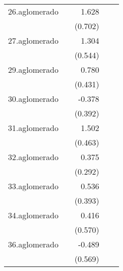 {\begin{longtable}{l*{4}{D{.}{.}{-1}}}
\addlinespace
26.aglomerado&                     &       1.628\sym{*}  &                     &                     \\
            &                     &     (0.702)         &                     &                     \\
\addlinespace
27.aglomerado&                     &       1.304\sym{*}  &                     &                     \\
            &                     &     (0.544)         &                     &                     \\
\addlinespace
29.aglomerado&                     &       0.780         &                     &                     \\
            &                     &     (0.431)         &                     &                     \\
\addlinespace
30.aglomerado&                     &      -0.378         &                     &                     \\
            &                     &     (0.392)         &                     &                     \\
\addlinespace
31.aglomerado&                     &       1.502\sym{**} &                     &                     \\
            &                     &     (0.463)         &                     &                     \\
\addlinespace
32.aglomerado&                     &       0.375         &                     &                     \\
            &                     &     (0.292)         &                     &                     \\
\addlinespace
33.aglomerado&                     &       0.536         &                     &                     \\
            &                     &     (0.393)         &                     &                     \\
\addlinespace
34.aglomerado&                     &       0.416         &                     &                     \\
            &                     &     (0.570)         &                     &                     \\
\addlinespace
36.aglomerado&                     &      -0.489         &                     &                     \\
            &                     &     (0.569)         &                     &                     \\

\end{longtable}}
